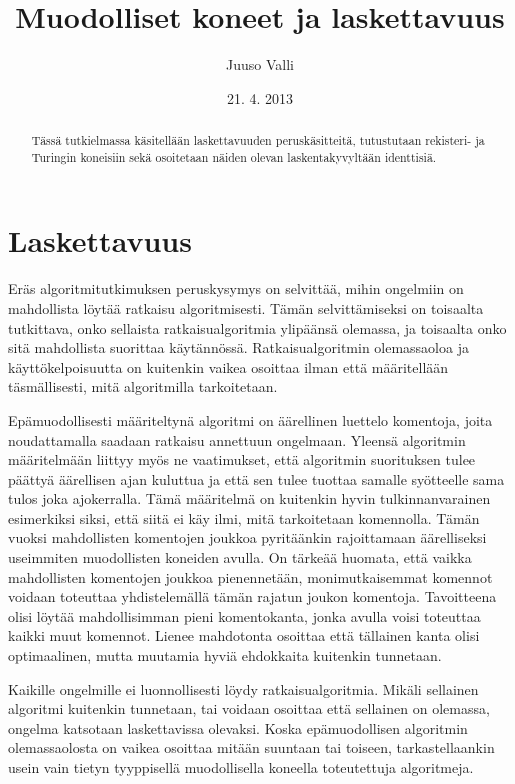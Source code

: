 \documentclass[a4paper, 12pt]{article}
\begin{document}
\title{Muodolliset koneet ja laskettavuus}
\author{Juuso Valli}
\date{21. 4. 2013}

\maketitle

\begin{abstract}
Tässä tutkielmassa käsitellään laskettavuuden peruskäsitteitä, 
tutustutaan rekisteri- ja Turingin koneisiin 
sekä osoitetaan näiden olevan laskentakyvyltään identtisiä.
\end{abstract}

\tableofcontents

\section{Laskettavuus}
Eräs algoritmitutkimuksen peruskysymys on selvittää, mihin ongelmiin on mahdollista löytää ratkaisu algoritmisesti. Tämän selvittämiseksi on toisaalta tutkittava, onko sellaista ratkaisualgoritmia ylipäänsä olemassa, ja toisaalta onko sitä mahdollista suorittaa käytännössä. Ratkaisualgoritmin olemassaoloa ja käyttökelpoisuutta on kuitenkin vaikea osoittaa ilman että määritellään täsmällisesti, mitä algoritmilla tarkoitetaan.

Epämuodollisesti määriteltynä algoritmi on äärellinen luettelo komentoja, joita noudattamalla saadaan ratkaisu annettuun ongelmaan. Yleensä algoritmin määritelmään liittyy myös ne vaatimukset, että algoritmin suorituksen tulee päättyä äärellisen ajan kuluttua ja että sen tulee tuottaa samalle syötteelle sama tulos joka ajokerralla. Tämä määritelmä on kuitenkin hyvin tulkinnanvarainen esimerkiksi siksi, että siitä ei käy ilmi, mitä tarkoitetaan komennolla. Tämän vuoksi mahdollisten komentojen joukkoa pyritäänkin rajoittamaan äärelliseksi useimmiten muodollisten koneiden avulla. On tärkeää huomata, että vaikka mahdollisten komentojen joukkoa pienennetään, monimutkaisemmat komennot voidaan toteuttaa yhdistelemällä tämän rajatun joukon komentoja. Tavoitteena olisi löytää mahdollisimman pieni komentokanta, jonka avulla voisi toteuttaa kaikki muut komennot. Lienee mahdotonta osoittaa että tällainen kanta olisi optimaalinen, mutta muutamia hyviä ehdokkaita kuitenkin tunnetaan.

Kaikille ongelmille ei luonnollisesti löydy ratkaisualgoritmia. Mikäli sellainen algoritmi kuitenkin tunnetaan, tai voidaan osoittaa että sellainen on olemassa, ongelma katsotaan laskettavissa olevaksi. Koska epämuodollisen algoritmin olemassaolosta on vaikea osoittaa mitään suuntaan tai toiseen, tarkastellaankin usein vain tietyn tyyppisellä muodollisella koneella toteutettuja algoritmeja.
\end{document}
